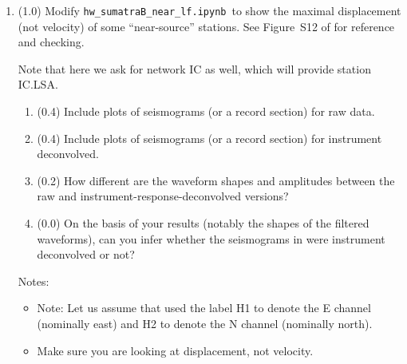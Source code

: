 \documentclass[11pt,titlepage,fleqn]{article}
\newcommand{\tfilenearlf}{{\tt hw\_sumatraB\_near\_lf.ipynb}}
\begin{document}
\begin{enumerate}
\item (1.0) Modify \tfilenearlf\ to show the maximal displacement (not velocity) of some ``near-source'' stations. See Figure~S12 of \citet{Ammon2005} for reference and checking.

Note that here we ask for network IC as well, which will provide station IC.LSA.

%
\begin{enumerate}
\item (0.4) Include plots of seismograms (or a record section) for raw data.

\item (0.4) Include plots of seismograms (or a record section) for instrument deconvolved.

\item (0.2) How different are the waveform shapes and amplitudes between the raw and instrument-response-deconvolved versions?

\item (0.0) On the basis of your results (notably the shapes of the filtered waveforms), can you infer whether the seismograms in \citet{Ammon2005} were instrument deconvolved or not?
\end{enumerate}
%
Notes:
%
\begin{itemize}
\item Note: Let us assume that \citet{Ammon2005} used the label H1 to denote the E channel (nominally east) and H2 to denote the N channel (nominally north).

\item Make sure you are looking at displacement, not velocity.

\end{itemize}



\end{enumerate}
\end{document}
